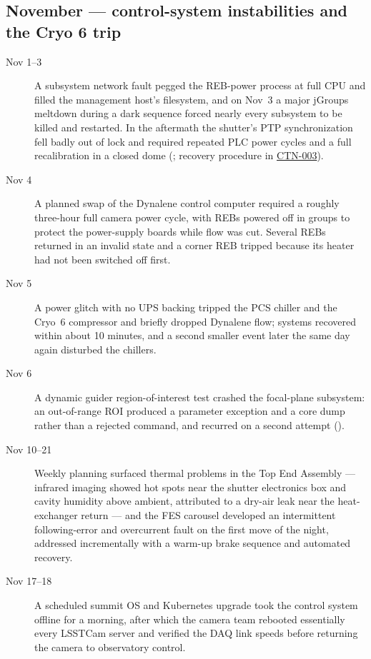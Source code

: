 \subsection{November --- control-system instabilities and the Cryo 6 trip}
\begin{description}
\item[Nov 1--3] A subsystem network fault pegged the REB-power process
  at full CPU and filled the management host's filesystem, and on
  Nov~3 a major jGroups meltdown during a dark sequence forced nearly
  every subsystem to be killed and restarted.  In the aftermath the
  shutter's PTP synchronization fell badly out of lock and required
  repeated PLC power cycles and a full recalibration in a closed dome
  (; recovery procedure in \href{https://ctn-003.lsst.io}{CTN-003}).

\item[Nov 4] A planned swap of the Dynalene control computer required
  a roughly three-hour full camera power cycle, with REBs powered off
  in groups to protect the power-supply boards while flow was cut.
  Several REBs returned in an invalid state and a corner REB tripped
  because its heater had not been switched off first.

\item[Nov 5] A power glitch with no UPS backing tripped the PCS
  chiller and the Cryo~6 compressor and briefly dropped Dynalene flow;
  systems recovered within about 10 minutes, and a second smaller
  event later the same day again disturbed the chillers.

\item[Nov 6] A dynamic guider region-of-interest test crashed the
  focal-plane subsystem: an out-of-range ROI produced a parameter
  exception and a core dump rather than a rejected command, and
  recurred on a second attempt ().

\item[Nov 10--21] Weekly planning surfaced thermal problems in the Top
  End Assembly --- infrared imaging showed hot spots near the shutter
  electronics box and cavity humidity above ambient, attributed to a
  dry-air leak near the heat-exchanger return --- and the FES carousel
  developed an intermittent following-error and overcurrent fault on
  the first move of the night, addressed incrementally with a warm-up
  brake sequence and automated recovery.

\item[Nov 17--18] A scheduled summit OS and Kubernetes upgrade took
  the control system offline for a morning, after which the camera
  team rebooted essentially every LSSTCam server and verified the DAQ
  link speeds before returning the camera to observatory control.


\end{description}
